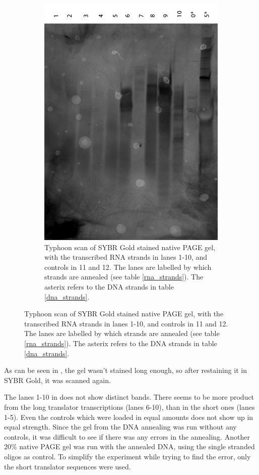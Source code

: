 \begin{figure}
\begin{subfigure}{0.49\textwidth}
    \includegraphics[width=\textwidth]{images/translator_transcription_2.png}
    \caption{Typhoon scan of SYBR Gold stained native PAGE gel, with the transcribed RNA strands in lanes 1-10, and controls in 11 and 12. The lanes are labelled by which strands are annealed (see table \ref{rna_strands}). The asterix refers to the DNA strands in table \ref{dna_strands}.}
    \label{transcription_2}
  \end{subfigure}
\end{figure}

As can be seen in , the gel wasn't stained long enough, so after restaining it in SYBR Gold, it was scanned again.

The lanes 1-10 in  does not show distinct bands. There seems to be more product from the long translator transcriptions (lanes 6-10), than in the short ones (lanes 1-5). Even the controls which were loaded in equal amounts does not show up in equal strength. Since the gel from the DNA annealing was run without any controls, it was difficult to see if there was any errors in the annealing. Another 20\% native PAGE gel was run with the annealed DNA, using the single stranded oligos as control. To simplify the experiment while trying to find the error, only the short translator sequences were used.

